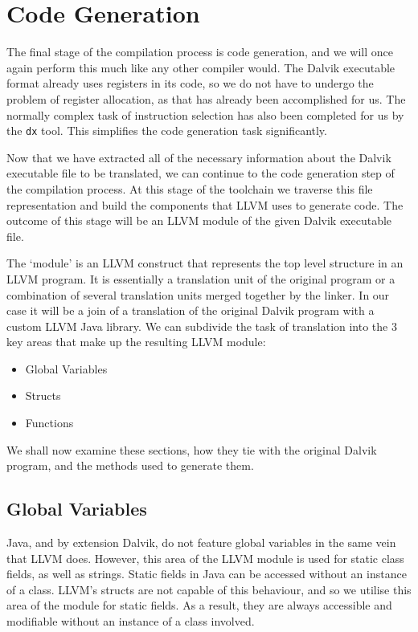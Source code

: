 \section{Code Generation}
\label{sec:codegen}

The final stage of the compilation process is code generation, and we will once again perform this much like any other compiler would. The Dalvik executable format already uses registers in its code, so we do not have to undergo the problem of register allocation, as that has already been accomplished for us. The normally complex task of instruction selection has also been completed for us by the \verb|dx| tool. This simplifies the code generation task significantly.

Now that we have extracted all of the necessary information about the Dalvik executable file to be translated, we can continue to the code generation step of the compilation process. At this stage of the toolchain we traverse this file representation and build the components that LLVM uses to generate code. The outcome of this stage will be an LLVM module of the given Dalvik executable file.

The `module' is an LLVM construct that represents the top level structure in an LLVM program. It is essentially a translation unit of the original program or a combination of several translation units merged together by the linker. In our case it will be a join of a translation of the original Dalvik program with a custom LLVM Java library. We can subdivide the task of translation into the 3 key areas that make up the resulting LLVM module:

\begin{itemize}
	\item Global Variables
	\item Structs
	\item Functions
\end{itemize}

We shall now examine these sections, how they tie with the original Dalvik program, and the methods used to generate them.

\subsection*{Global Variables}

Java, and by extension Dalvik, do not feature global variables in the same vein that LLVM does. However, this area of the LLVM module is used for static class fields, as well as strings. Static fields in Java can be accessed without an instance of a class. LLVM's structs are not capable of this behaviour, and so we utilise this area of the module for static fields. As a result, they are always accessible and modifiable without an instance of a class involved.

